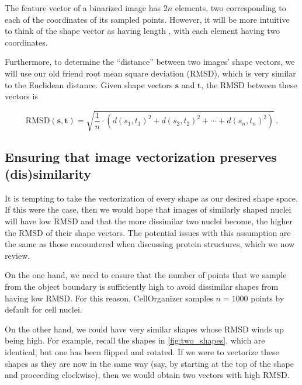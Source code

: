 \begin{note}\end{note}

The feature vector of a binarized image has $2n$ elements, two corresponding to each of the coordinates of its  sampled points. However, it will be more intuitive to think of the shape vector as having length , with each element having two coordinates.

Furthermore, to determine the ``distance'' between two images' shape vectors, we will use our old friend root mean square deviation (RMSD), which is very similar to the Euclidean distance. Given shape vectors $\mathbf{s}$ and $\mathbf{t}$, the RMSD between these vectors is

$$\text{RMSD}(\mathbf{s}, \mathbf{t}) = \sqrt{\dfrac{1}{n} \cdot (d(s_1, t_1)^2 + d(s_2, t_2)^2 + \cdots + d(s_n, t_n)^2)}\,. $$

\FloatBarrier
{}
\subsection{Ensuring that image vectorization preserves (dis)similarity}

It is tempting to take the vectorization of every shape as our desired shape space. If this were the case, then we would hope that images of similarly shaped nuclei will have low RMSD and that the more dissimilar two nuclei become, the higher the RMSD of their shape vectors. The potential issues with this assumption are the same as those encountered when discussing protein structures, which we now review.

On the one hand, we need to ensure that the number of points that we sample from the object boundary is sufficiently high to avoid dissimilar shapes from having low RMSD. For this reason, CellOrganizer samples $n = 1000$ points by default for cell nuclei.

On the other hand, we could have very similar shapes whose RMSD winds up being high. For example, recall the shapes in \autoref{fig:two_shapes}, which are identical, but one has been flipped and rotated. If we were to vectorize these shapes as they are now in the same way (say, by starting at the top of the shape and proceeding clockwise), then we would obtain two vectors with high RMSD.

